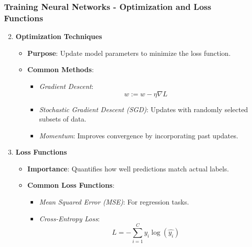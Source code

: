 \documentclass[aspectratio=169]{beamer}
\begin{document}
\begin{frame}[fragile]
    \frametitle{Training Neural Networks - Optimization and Loss Functions}
    \begin{enumerate}
        \setcounter{enumi}{1}
        \item \textbf{Optimization Techniques}
            \begin{itemize}
                \item \textbf{Purpose}: Update model parameters to minimize the loss function.
                \item \textbf{Common Methods}:
                    \begin{itemize}
                        \item \textit{Gradient Descent}:
                          \[
                          w := w - \eta \nabla L
                          \]
                        \item \textit{Stochastic Gradient Descent (SGD)}: Updates with randomly selected subsets of data.
                        \item \textit{Momentum}: Improves convergence by incorporating past updates.
                    \end{itemize}
            \end{itemize}
        \item \textbf{Loss Functions}
            \begin{itemize}
                \item \textbf{Importance}: Quantifies how well predictions match actual labels.
                \item \textbf{Common Loss Functions}:
                    \begin{itemize}
                        \item \textit{Mean Squared Error (MSE)}: For regression tasks.
                        \item \textit{Cross-Entropy Loss}:
                          \[
                          L = -\sum_{i=1}^{C} y_i \log(\hat{y_i})
                          \]
                    \end{itemize}
            \end{itemize}
    \end{enumerate}
\end{frame}
\end{document}
